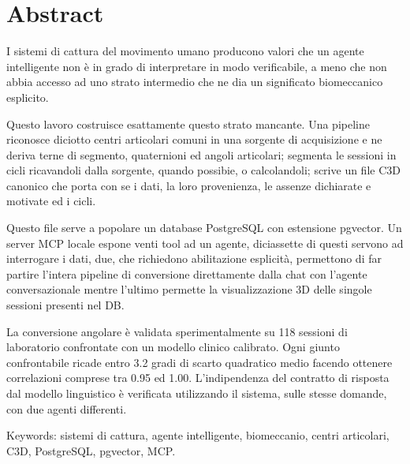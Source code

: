 \thispagestyle{plain}			%
\setlength{\parskip}{0pt plus 1.0pt}
\section*{Abstract}

I sistemi di cattura del movimento umano producono valori che un agente 
intelligente non è in grado di interpretare in modo verificabile, a meno che non 
abbia accesso ad uno strato intermedio che ne dia un significato biomeccanico esplicito.

Questo lavoro costruisce esattamente questo strato mancante. Una pipeline riconosce 
diciotto centri articolari comuni in una sorgente di acquisizione e ne deriva 
terne di segmento, quaternioni ed angoli articolari; segmenta le sessioni in cicli ricavandoli 
dalla sorgente, quando possibie, o calcolandoli; scrive un file C3D canonico che porta con se 
i dati, la loro provenienza, le assenze dichiarate e motivate ed i cicli.

Questo file serve a popolare un database PostgreSQL con estensione pgvector. Un 
server MCP locale espone venti tool ad un agente, diciassette di questi servono ad 
interrogare i dati, due, che richiedono abilitazione esplicità, permettono di far 
partire l'intera pipeline di conversione direttamente dalla chat con l'agente conversazionale 
mentre l'ultimo permette la visualizzazione 3D delle singole sessioni presenti nel DB.

La conversione angolare è validata sperimentalmente su 118 sessioni di laboratorio 
confrontate con un modello clinico calibrato. Ogni giunto confrontabile ricade entro 
3.2 gradi di scarto quadratico medio facendo ottenere correlazioni comprese tra 0.95 ed 1.00. 
L’indipendenza del contratto di risposta dal modello linguistico è verificata utilizzando il 
sistema, sulle stesse domande, con due agenti differenti.

\vfill
Keywords: sistemi di cattura, agente intelligente, biomeccanio, centri articolari, C3D, 
PostgreSQL, pgvector, MCP.

\thispagestyle{empty}
\mbox{}
